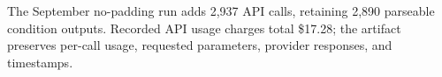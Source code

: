 The September no-padding run adds 2,937 API calls, retaining 2,890 parseable condition outputs. Recorded API usage charges total \$17.28; the artifact preserves per-call usage, requested parameters, provider responses, and timestamps.